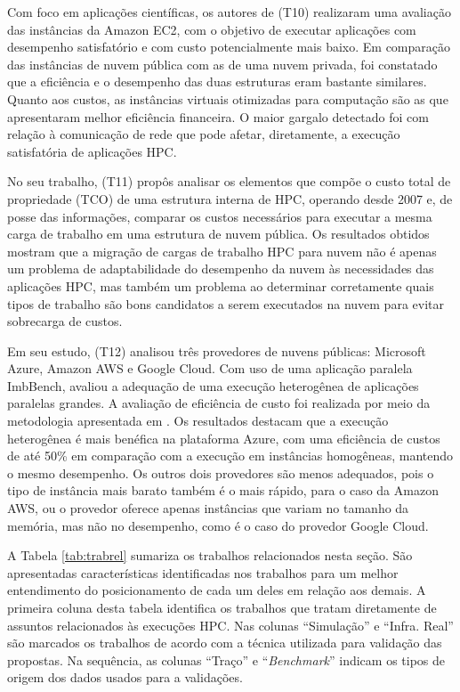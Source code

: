 \documentclass[tese,capa]{texufpel}
\begin{document}
Com foco em aplicações científicas, os autores de \cite{sadooghiUnderstandingPerformancePotential2017d} (T10) realizaram uma avaliação das instâncias da Amazon EC2, com o objetivo de executar aplicações com desempenho satisfatório e com custo potencialmente mais baixo. Em comparação das instâncias de nuvem pública com as de uma nuvem privada, foi constatado que a eficiência e o desempenho das duas estruturas eram bastante similares. Quanto aos custos, as instâncias virtuais otimizadas para computação são as que apresentaram melhor eficiência financeira. O maior gargalo detectado foi com relação à comunicação de rede que pode afetar, diretamente, a execução satisfatória de aplicações HPC.

No seu trabalho, \cite{emerasAmazonElasticCompute2019c} (T11) propôs analisar os elementos que compõe o custo total de propriedade (TCO) de uma estrutura interna de HPC, operando desde 2007 e, de posse das informações, comparar os custos necessários para executar a mesma carga de trabalho em uma estrutura de nuvem pública. Os resultados obtidos mostram que a migração de cargas de trabalho HPC para nuvem não é apenas um problema de adaptabilidade do desempenho da nuvem às necessidades das aplicações HPC, mas também um problema ao determinar corretamente quais tipos de trabalho são bons candidatos a serem executados na nuvem para evitar sobrecarga de custos.

Em seu estudo, \cite{roloffExploringInstanceHeterogeneity2019a} (T12) analisou três provedores de nuvens públicas: Microsoft Azure, Amazon AWS e Google Cloud. Com uso de uma aplicação paralela ImbBench, avaliou a adequação de uma execução heterogênea de aplicações paralelas grandes. A avaliação de eficiência de custo foi realizada por meio da metodologia apresentada em \cite{roloffHighPerformanceComputing2012c}. Os resultados destacam que a execução heterogênea é mais benéfica na plataforma Azure, com uma eficiência de custos de até 50\% em comparação com a execução em instâncias homogêneas, mantendo o mesmo desempenho. Os outros dois provedores são menos adequados, pois o tipo de instância mais barato também é o mais rápido, para o caso da Amazon AWS, ou o provedor oferece apenas instâncias que variam no tamanho da memória, mas não no desempenho, como é o caso do provedor Google Cloud. 

A Tabela \ref{tab:trabrel} sumariza os trabalhos relacionados nesta seção. São apresentadas características identificadas nos trabalhos para um melhor entendimento do posicionamento de cada um deles em relação aos demais. A primeira coluna desta tabela identifica os trabalhos que tratam diretamente de assuntos relacionados às execuções HPC. Nas colunas ``Simulação'' e ``Infra. Real'' são marcados os trabalhos de acordo com a técnica utilizada para validação das propostas. Na sequência, as colunas ``Traço'' e ``\textit{Benchmark}'' indicam os tipos de origem dos dados usados para a validações.
\end{document}
